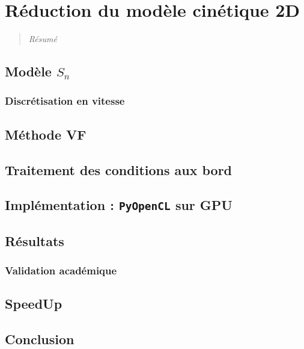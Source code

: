 \chapter{Réduction du modèle cinétique 2D}
\label{chap:ch2}
\begin{quotation}
\textit{Résumé}
\end{quotation}
\minitoc
\newpage
 
  
\section{Modèle $S_n$}
\subsection{Discrétisation en vitesse}
\section{Méthode VF}
\section{Traitement des conditions aux bord}
\section{Implémentation : \texttt{PyOpenCL} sur GPU}
\section{Résultats}
\subsection{Validation académique}
\section{SpeedUp}
\section{Conclusion}